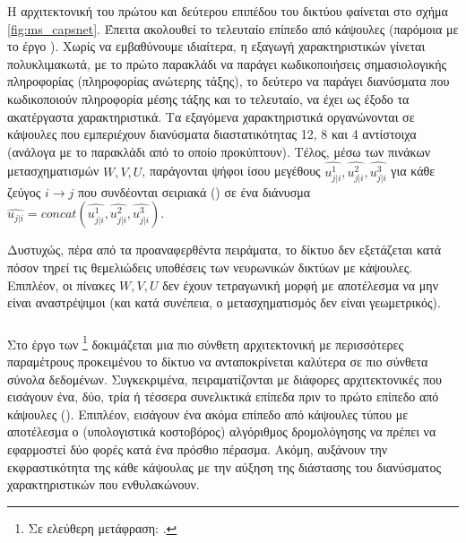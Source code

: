 Η αρχιτεκτονική του πρώτου και δεύτερου επιπέδου του δικτύου φαίνεται στο σχήμα \ref{fig:ms_capsnet}. Έπειτα ακολουθεί το τελευταίο επίπεδο από κάψουλες (παρόμοια με το έργο \cite{sabour2017dynamic}). Χωρίς να εμβαθύνουμε ιδιαίτερα, η εξαγωγή χαρακτηριστικών γίνεται πολυκλιμακωτά, με το πρώτο παρακλάδι να παράγει κωδικοποιήσεις σημασιολογικής πληροφορίας (πληροφορίας ανώτερης τάξης), το δεύτερο να παράγει διανύσματα που κωδικοποιούν πληροφορία μέσης τάξης και το τελευταίο, να έχει ως έξοδο τα ακατέργαστα χαρακτηριστικά. Τα εξαγόμενα χαρακτηριστικά οργανώνονται σε κάψουλες που εμπεριέχουν διανύσματα διαστατικότητας 12, 8 και 4 αντίστοιχα (ανάλογα με το παρακλάδι από το οποίο προκύπτουν). Τέλος, μέσω των πινάκων μετασχηματισμών $W, V, U$, παράγονται ψήφοι ίσου μεγέθους  $\hat{u^1_{j|i}}, \hat{u^2_{j|i}}, \hat{u^3_{j|i}}$ για κάθε ζεύγος $i \rightarrow j$ που συνδέονται σειριακά () σε ένα διάνυσμα $\hat{u_{j|i}} = concat(\hat{u^1_{j|i}}, \hat{u^2_{j|i}}, \hat{u^3_{j|i}})$.\par

Δυστυχώς, πέρα από τα προαναφερθέντα πειράματα, το δίκτυο δεν εξετάζεται κατά πόσον τηρεί τις θεμελιώδεις υποθέσεις των νευρωνικών δικτύων με κάψουλες. Επιπλέον, οι πίνακες $W, V, U$ δεν έχουν τετραγωνική μορφή με αποτέλεσμα να μην είναι αναστρέψιμοι (και κατά συνέπεια, ο μετασχηματισμός δεν είναι γεωμετρικός).

\subsubsection{}

Στο έργο των  \footnote{Σε ελεύθερη μετάφραση: .} \cite{liu2019ddrm} δοκιμάζεται μια πιο σύνθετη αρχιτεκτονική με περισσότερες παραμέτρους προκειμένου το δίκτυο να ανταποκρίνεται καλύτερα σε πιο σύνθετα σύνολα δεδομένων. Συγκεκριμένα, πειραματίζονται με διάφορες αρχιτεκτονικές που εισάγουν ένα, δύο, τρία ή τέσσερα συνελικτικά επίπεδα πριν το πρώτο επίπεδο από κάψουλες (). Επιπλέον, εισάγουν ένα ακόμα επίπεδο από κάψουλες τύπου  με αποτέλεσμα ο (υπολογιστικά κοστοβόρος) αλγόριθμος δρομολόγησης να πρέπει να εφαρμοστεί δύο φορές κατά ένα πρόσθιο πέρασμα. Ακόμη, αυξάνουν την εκφραστικότητα της κάθε κάψουλας με την αύξηση της διάστασης του διανύσματος χαρακτηριστικών που ενθυλακώνουν.\par

